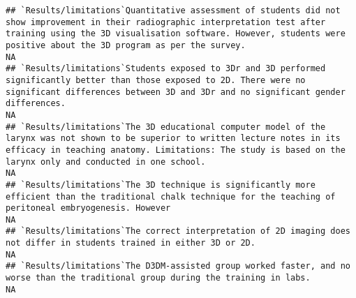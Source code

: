 \documentclass[]{article}
\begin{document}
\begin{verbatim}
## `Results/limitations`Quantitative assessment of students did not show improvement in their radiographic interpretation test after training using the 3D visualisation software. However, students were positive about the 3D program as per the survey.                                                                                                                                                                                                                               NA
## `Results/limitations`Students exposed to 3Dr and 3D performed significantly better than those exposed to 2D. There were no significant differences between 3D and 3Dr and no significant gender differences.                                                                                                                                                                                                                                                                          NA
## `Results/limitations`The 3D educational computer model of the larynx was not shown to be superior to written lecture notes in its efficacy in teaching anatomy. Limitations: The study is based on the larynx only and conducted in one school.                                                                                                                                                                                                                                       NA
## `Results/limitations`The 3D technique is significantly more efficient than the traditional chalk technique for the teaching of peritoneal embryogenesis. However                                                                                                                                                                                                                                                                                                                      NA
## `Results/limitations`The correct interpretation of 2D imaging does not differ in students trained in either 3D or 2D.                                                                                                                                                                                                                                                                                                                                                                 NA
## `Results/limitations`The D3DM-assisted group worked faster, and no worse than the traditional group during the training in labs.                                                                                                                                                                                                                                                                                                                                                      NA

\end{verbatim}
\end{document}
